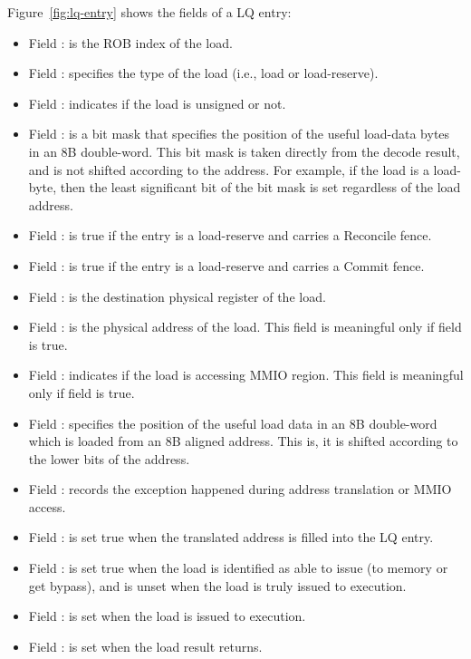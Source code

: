 Figure~\ref{fig:lq-entry} shows the fields of a LQ entry:
\begin{itemize}
    \item Field : is the ROB index of the load.
    \item Field : specifies the type of the load (i.e., load or load-reserve).
    \item Field : indicates if the load is unsigned or not.
    \item Field : is a bit mask that specifies the position of the useful load-data bytes in an 8B double-word.
    This bit mask is taken directly from the decode result, and is not shifted according to the address.
    For example, if the load is a load-byte, then the least significant bit of the bit mask is set regardless of the load address.
    \item Field : is true if the entry is a load-reserve and carries a Reconcile fence.
    \item Field : is true if the entry is a load-reserve and carries a Commit fence.
    \item Field : is the destination physical register of the load.
    \item Field : is the physical address of the load.
    This field is meaningful only if field  is true.
    \item Field : indicates if the load is accessing MMIO region.
    This field is meaningful only if field  is true.
    \item Field : specifies the position of the useful load data in an 8B double-word which is loaded from an 8B aligned address.
    This is, it is  shifted according to the lower bits of the address.
    \item Field : records the exception happened during address translation or MMIO access.
    \item Field : is set true when the translated address is filled into the LQ entry.
    \item Field : is set true when the load is identified as able to issue (to memory or get bypass), and is unset when the load is truly issued to execution.
    \item Field : is set when the load is issued to execution.
    \item Field : is set when the load result returns.

\end{itemize}
